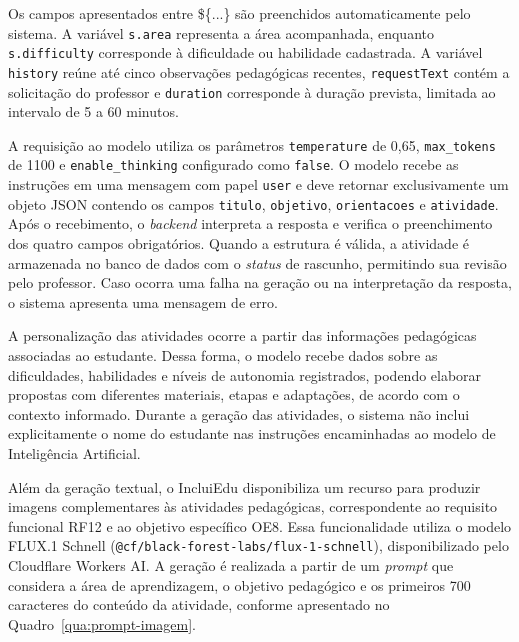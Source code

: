 Os campos apresentados entre \$\{...\} são preenchidos automaticamente pelo sistema. A variável \texttt{s.area} representa a área acompanhada, enquanto \texttt{s.difficulty} corresponde à dificuldade ou habilidade cadastrada. A variável \texttt{history} reúne até cinco observações pedagógicas recentes, \texttt{requestText} contém a solicitação do professor e \texttt{duration} corresponde à duração prevista, limitada ao intervalo de 5 a 60 minutos.

A requisição ao modelo utiliza os parâmetros \texttt{temperature} de 0,65, \texttt{max\_tokens} de 1100 e \texttt{enable\_thinking} configurado como \texttt{false}. O modelo recebe as instruções em uma mensagem com papel \texttt{user} e deve retornar exclusivamente um objeto JSON contendo os campos \texttt{titulo}, \texttt{objetivo}, \texttt{orientacoes} e \texttt{atividade}. Após o recebimento, o \textit{backend} interpreta a resposta e verifica o preenchimento dos quatro campos obrigatórios. Quando a estrutura é válida, a atividade é armazenada no banco de dados com o \textit{status} de rascunho, permitindo sua revisão pelo professor. Caso ocorra uma falha na geração ou na interpretação da resposta, o sistema apresenta uma mensagem de erro.

A personalização das atividades ocorre a partir das informações pedagógicas associadas ao estudante. Dessa forma, o modelo recebe dados sobre as dificuldades, habilidades e níveis de autonomia registrados, podendo elaborar propostas com diferentes materiais, etapas e adaptações, de acordo com o contexto informado. Durante a geração das atividades, o sistema não inclui explicitamente o nome do estudante nas instruções encaminhadas ao modelo de Inteligência Artificial.

Além da geração textual, o IncluiEdu disponibiliza um recurso para produzir imagens complementares às atividades pedagógicas, correspondente ao requisito funcional RF12 e ao objetivo específico OE8. Essa funcionalidade utiliza o modelo FLUX.1 Schnell (\texttt{@cf/black-forest-labs/flux-1-schnell}), disponibilizado pelo Cloudflare Workers AI. A geração é realizada a partir de um \textit{prompt} que considera a área de aprendizagem, o objetivo pedagógico e os primeiros 700 caracteres do conteúdo da atividade, conforme apresentado no Quadro~\ref{qua:prompt-imagem}.

